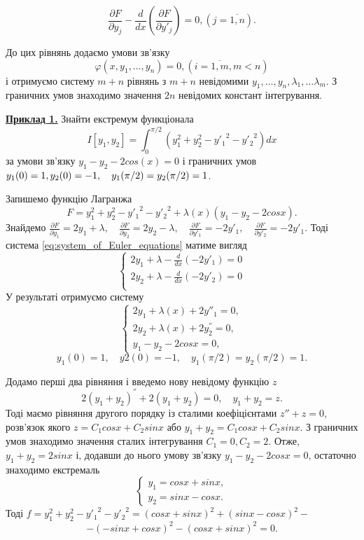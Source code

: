\documentclass[a4paper]{article}
\begin{document}
	\begin{equation}\label{eq:system_of_Euler_equations}
		\frac{\partial F}{\partial y_j} - \frac{d}{dx} \left(\frac{\partial F}{\partial y'_j}\right) = 0, (j = \overline{1, n}).
	\end{equation}

	До цих рівнянь додаємо умови зв’язку
	\begin{equation}
		\varphi(x, y_1, \ldots, y_n) = 0, (i = \overline{1, m}, m < n)
	\end{equation}
	і отримуємо систему $m+n$ рівнянь з $m+n$ невідомими $ y_1, \ldots, y_n, \lambda_1, \ldots \lambda_m $.
	З граничних умов знаходимо значення $2n$ невідомих констант інтегрування.

	\underline{\textbf{Приклад 1.}} Знайти екстремум функціонала
	$$I[y_1, y_2] = \int_{0}^{\pi/2} (y_1^{2} + y_2^{2} - {y'_1}^{2} - {y'_2}^{2})dx$$
	за умови зв’язку $y_1 - y_2 - 2cos(x) = 0$ і граничних умов
	$y_1(0) = 1, \\ y_2(0) = -1,\quad y_1(\pi/2) = y_2(\pi/2) = 1$.
	
	Запишемо функцію Лагранжа
	$$F = y_1^2 + y_2^2 - {y'_1}^{2} - {y'_2}^{2} + \lambda(x)(y_1 - y_2 - 2cosx).$$
	Знайдемо $\frac{\partial F}{\partial y_1} = 2y_1 + \lambda, \quad
		\frac{\partial F}{\partial y_2} = 2y_2 - \lambda, \quad
		\frac{\partial F}{\partial y'_1} = -2y'_1, \quad
		\frac{\partial F}{\partial y'_2} = -2y'_1$. 
	Тоді система \eqref{eq:system_of_Euler_equations} матиме вигляд
	$$\begin{cases}
		2y_1 + \lambda - \frac{d}{dx}\left(-2y'_1\right) = 0 \\
		2y_2 + \lambda - \frac{d}{dx}\left(-2y'_2\right) = 0 \\
	\end{cases}$$
	У результаті отримуємо систему 
	$$\begin{cases}
		2y_1 + \lambda(x) + 2y''_1 = 0, \\
		2y_2 + \lambda(x) + 2y_2^{''} = 0, \\
		y_1 - y_2 - 2cosx = 0,
	\end{cases}$$
	$$y_1(0) = 1,\quad y2(0) = -1,\quad y_1(\pi/2) = y_2(\pi/2) = 1.$$
	
	Додамо перші два рівняння і введемо нову невідому функцію $z$
	$$2(y_1 + y_2)^{''} + 2(y_1 + y_2) = 0, \quad y_1 + y_2 = z.$$
	Тоді маємо рівняння другого порядку із сталими коефіцієнтами $z'' + z = 0$,
	розв’язок якого $z = C_1cosx + C_2sinx$ або $y_1 + y_2 = C_1cosx + C_2sinx$.
	З граничних умов  знаходимо значення сталих інтегрування $C_1 = 0, C_2 = 2$. Отже,
	$y_1 + y_2 = 2 sinx$ і, додавши до нього умову зв’язку $y_1 - y_2 - 2cosx = 0$, остаточно
	знаходимо екстремаль
	$$\begin{cases}
		y_1 = cosx + sinx,\\
		y_2 = sinx - cosx.
	\end{cases}$$
	Тоді $f = y_1^{2} + y_2^{2} - {y'_1}^{2} -{y'_2}^{2} = (cosx + sinx)^2 + (sinx - cosx)^2 - $ 
		$$-(-sinx + cosx)^2 - (cosx + sinx)^2 = 0.$$
\end{document}
